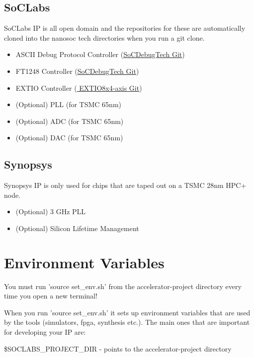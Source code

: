 \documentclass{report}
\makeatletter
\newenvironment{infobox}[1][]{%
   \begin{info@box}%
      \begin{tcolorbox}[colback=red!15!white,%
            colframe=red!75!black,%
            title=Additional information\ifstrempty{#1}{}{: #1}.%
         ]%
}{%
      \end{tcolorbox}%
   \end{info@box}%
}
\makeatother
\begin{document}
\subsection{SoCLabs}
SoCLabs IP is all open domain and the repositories for these are automatically cloned into the nanosoc tech directories when you run a git clone.
\begin{itemize}
    \item ASCII Debug Protocol Controller (\href{https://git.soton.ac.uk/soclabs/socdebug_tech}{SoCDebugTech Git})
    \item FT1248 Controller (\href{https://git.soton.ac.uk/soclabs/socdebug_tech}{SoCDebugTech Git})
    \item EXTIO Controller (\href{https://git.soton.ac.uk/soclabs/extio8x4-axis}{ EXTIO8x4-axis Git})
    \item (Optional) PLL (for TSMC 65nm)
    \item (Optional) ADC (for TSMC 65nm)
    \item (Optional) DAC (for TSMC 65nm)
\end{itemize}
\subsection{Synopsys} \label{synopsys_ip}
Synopsys IP is only used for chips that are taped out on a TSMC 28nm HPC+ node.
\begin{itemize}
    \item (Optional) 3 GHz PLL
    \item (Optional) Silicon Lifetime Management 
\end{itemize}

\section{Environment Variables}\label{env_var}

\begin{infobox}
    You must run 'source set\_env.sh' from the accelerator-project directory every time you open a new terminal!
\end{infobox} \par

When you run 'source set\_env.sh' it sets up environment variables that are used by the tools (simulators, fpga, synthesis etc.). 
The main ones that are important for developing your IP are:

\$SOCLABS\_PROJECT\_DIR - points to the accelerator-project directory
\end{document}

